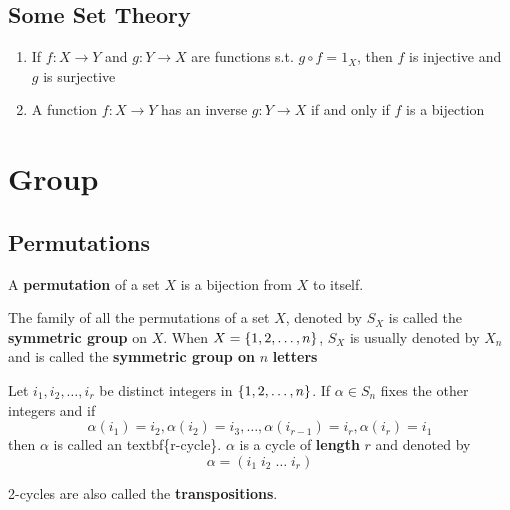 \documentclass[11pt]{article}
\begin{document}
\subsection{Some Set Theory}
\label{sec:org04457c7}
\begin{proposition}[]
\label{prop1.47}
\begin{enumerate}
\item If \(f:X\to Y\) and \(g:Y\to X\) are functions s.t. \(g\circ f=1_X\), then
\(f\) is injective and \(g\) is surjective
\item A function \(f:X\to Y\) has an inverse \(g:Y\to X\) if and only if \(f\) is a bijection
\end{enumerate}
\end{proposition}
\section{Group }
\label{sec:org43e25cc}
\subsection{Permutations}
\label{sec:orgca5695b}
\begin{definition}[]
A \textbf{permutation} of a set \(X\) is a bijection from \(X\) to itself.
\end{definition}


\begin{definition}[]
The family of all the permutations of a set \(X\), denoted by \(S_X\) is called
the \textbf{symmetric group} on \(X\). When \(X=\left\{ 1,2,\dots,n\right\}\), \(S_X\) is
usually denoted by \(X_n\) and is called the \textbf{symmetric group on } \(n\)
\textbf{letters} 
\end{definition}

\begin{definition}[]
Let \(i_1,i_2,\dots,i_r\) be distinct integers in \(\left\{ 1,2,\dots,n\right\}\). If
\(\alpha\in S_n\) fixes the other integers and if
\begin{equation*}
\alpha(i_1)=i_2,\alpha(i_2)=i_3,\dots,\alpha(i_{r-1})=i_r,\alpha(i_r)=i_1
\end{equation*}
then \(\alpha\) is called an textbf\{r-cycle\}. \(\alpha\) is a cycle of
\textbf{length} \(r\) and denoted by
\begin{equation*}
\alpha=(i_1\; i_2\;\dots\; i_r)
\end{equation*}
\end{definition}

2-cycles are also called the \textbf{transpositions}.
\end{document}
